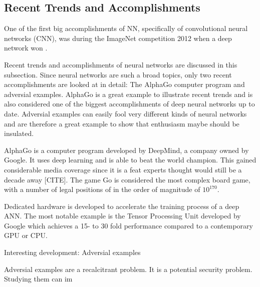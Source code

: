 \subsection{Recent Trends and Accomplishments}\label{subsec:trends}

One of the first big accomplishments of NN, specifically of convolutional neural networks (CNN), was during the ImageNet competition 2012 when a deep network won \cite{krizhevsky}.

Recent trends and accomplishments of neural networks are discussed in this subsection. Since neural networks are such a broad topics, only two recent accomplishments are looked at in detail: The AlphaGo computer program and adversial examples. AlphaGo is a great example to illustrate recent trends and is also considered one of the biggest accomplishments of deep neural networks up to date. Adversial examples can easily fool very different kinds of neural networks and are therefore a great example to show that enthusiasm maybe should be insulated.

AlphaGo is a computer program developed by DeepMind, a company owned by Google. It uses deep learning and is able to beat the world champion. This gained considerable media coverage since it is a feat experts thought would still be a decade away [CITE]. The game Go is considered the most complex board game, with a number of legal positions of in the order of magnitude of $10^{170}$\cite{tromp2006combinatorics}.

Dedicated hardware is developed to accelerate the training process of a deep ANN. The most notable example is the Tensor Processing Unit developed by Google which achieves a 15- to 30 fold performance compared to a contemporary GPU or CPU\cite{jouppi2017datacenter}.

\cite{silver2016mastering}
\cite{silver2017mastering}

Interesting development: Adversial examples


Adversial examples are a recalcitrant problem. It is a potential security problem. Studying them can im
\cite{Nguyen_2015_CVPR}
\cite{goodfellow2014explaining}